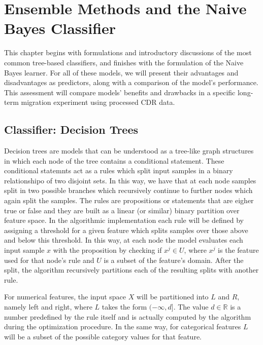 \chapter{Ensemble Methods and the Naive Bayes Classifier}\label{ch:ensembleMethods}

This chapter begins with formulations and introductory discussions of the most common tree-based classifiers, and finishes with the formulation of the Naive Bayes learner.
For all of these models, we will present their advantages and disadvantages as predictors, along with a comparison of the model's performance.
This assessment will compare models' benefits and drawbacks in a specific long-term migration experiment using processed CDR data.

\section{Classifier: Decision Trees}\label{section:decision_trees}


Decision trees are models that can be understood as a tree-like graph structures in which each node of the tree contains a conditional statement. 
These conditional statemnts act as a rules which split input samples in a binary relationshipo of two disjoint sets.
In this way, we have that at each node samples split in two possible branches which recursively continue to further nodes which again split the samples.
The rules are propositions or statements that are eigher true or false and they are built as a linear (or similar) binary partition over feature space. 
In the algorithmic implementation each rule will be defined by assigning a threshold for a given feature which splits samples over those above and below this threshold.
In this way, at each node the model evaluates each input sample $x$ with the proposition by checking if $x^j \in U$, where $x^j$ is the feature used for that node's rule and $U$ is a subset of the feature's domain.
After the split, the algorithm recursively partitions each of the resulting splits with another rule. 


For numerical features, the input space $X$ will be partitioned into $L$ and $R$, namely left and right, where $L$ takes the form $(-\infty,d]$. The value $d \in \mathbb{R}$ is a number predefined by the rule itself and is actually computed by the algorithm during the optimization procedure.
In the same way, for categorical features $L$ will be a subset of the possible category values for that feature.

